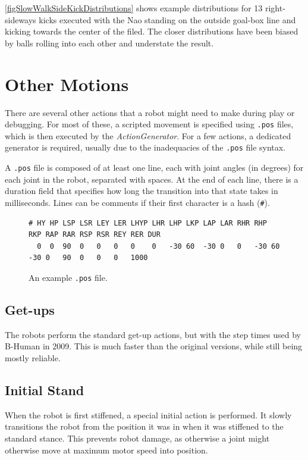 \documentclass[pdftex,11pt,a4paper]{report}
\begin{document}
\autoref{figSlowWalkSideKickDistributions} shows example distributions for 13 right-sideways kicks executed with the Nao standing on the outside goal-box line and kicking towards the center of the filed. The closer distributions have been biased by balls rolling into each other and understate the result.  


\section{Other Motions} \label{posFiles}
There are several other actions that a robot might need to make during play
or debugging. For most of these, a scripted movement is specified using
\texttt{.pos} files, which is then executed by the \emph{ActionGenerator}.
For a few actions, a dedicated generator is required, usually due to the
inadequacies of the \texttt{.pos} file syntax.

A \texttt{.pos} file is composed of at least one line, each with joint
angles (in degrees) for each joint in the robot, separated with spaces. At
the end of each line, there is a duration field that specifies how long the
transition into that state takes in milliseconds. Lines can be comments if
their first character is a hash (\texttt{\#}).

\begin{figure}[ht]
    \begin{center}
        \small
        \begin{verbatim}
# HY HP LSP LSR LEY LER LHYP LHR LHP LKP LAP LAR RHR RHP RKP RAP RAR RSP RSR REY RER DUR
  0  0  90  0   0   0   0    0   -30 60  -30 0   0   -30 60  -30 0   90  0   0   0   1000
        \end{verbatim}
    \end{center}
    \vspace{-25pt}
    \caption{An example \texttt{.pos} file.}
    \vspace{-15pt}
    \label{fig:pos_syntax}
\end{figure}

\subsection{Get-ups}
The robots perform the standard get-up actions, but with the step times
used by B-Human in 2009\cite{thomas09code}. This is much faster than the
original versions, while still being mostly reliable.

\subsection{Initial Stand}
When the robot is first stiffened, a special initial action is performed.
It slowly transitions the robot from the position it was in when it was
stiffened to the standard stance. This prevents robot damage, as otherwise
a joint might otherwise move at maximum motor speed into position.
\end{document}
